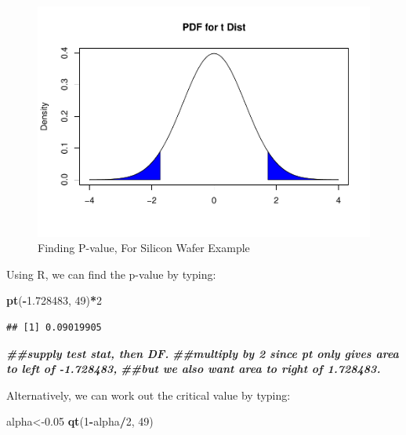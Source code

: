 \documentclass[
]{book}
\newenvironment{Shaded}{\begin{snugshade}}{\end{snugshade}}
\newcommand{\DecValTok}[1]{\textcolor[rgb]{0.00,0.00,0.81}{#1}}
\newcommand{\DocumentationTok}[1]{\textcolor[rgb]{0.56,0.35,0.01}{\textbf{\textit{#1}}}}
\newcommand{\FloatTok}[1]{\textcolor[rgb]{0.00,0.00,0.81}{#1}}
\newcommand{\FunctionTok}[1]{\textcolor[rgb]{0.13,0.29,0.53}{\textbf{#1}}}
\newcommand{\NormalTok}[1]{#1}
\newcommand{\OtherTok}[1]{\textcolor[rgb]{0.56,0.35,0.01}{#1}}
\newcommand{\SpecialCharTok}[1]{\textcolor[rgb]{0.81,0.36,0.00}{\textbf{#1}}}
\begin{document}
\begin{figure}
\centering
\includegraphics{bookdown-demo_files/figure-latex/9-pvalworked-1.pdf}
\caption{\label{fig:9-pvalworked}Finding P-value, For Silicon Wafer Example}
\end{figure}

Using R, we can find the p-value by typing:

\begin{Shaded}
\begin{Highlighting}[]
\FunctionTok{pt}\NormalTok{(}\SpecialCharTok{{-}}\FloatTok{1.728483}\NormalTok{, }\DecValTok{49}\NormalTok{)}\SpecialCharTok{*}\DecValTok{2} 
\end{Highlighting}
\end{Shaded}

\begin{verbatim}
## [1] 0.09019905
\end{verbatim}

\begin{Shaded}
\begin{Highlighting}[]
\DocumentationTok{\#\#supply test stat, then DF.}
\DocumentationTok{\#\#multiply by 2 since pt only gives area to left of {-}1.728483, }
\DocumentationTok{\#\#but we also want area to right of 1.728483. }
\end{Highlighting}
\end{Shaded}

Alternatively, we can work out the critical value by typing:

\begin{Shaded}
\begin{Highlighting}[]
\NormalTok{alpha}\OtherTok{\textless{}{-}}\FloatTok{0.05}
\FunctionTok{qt}\NormalTok{(}\DecValTok{1}\SpecialCharTok{{-}}\NormalTok{alpha}\SpecialCharTok{/}\DecValTok{2}\NormalTok{, }\DecValTok{49}\NormalTok{)}
\end{Highlighting}
\end{Shaded}
\end{document}
